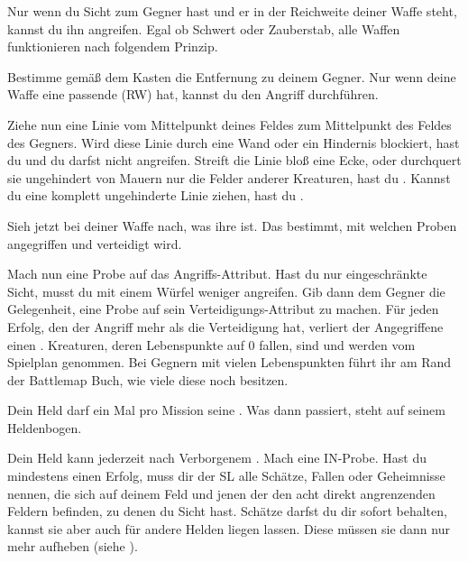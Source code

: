 {	

			Nur wenn du Sicht zum Gegner hast und er in der Reichweite deiner Waffe steht, kannst du ihn angreifen. Egal ob Schwert oder Zauberstab, alle Waffen funktionieren nach folgendem Prinzip.

			Bestimme gemäß dem Kasten  die Entfernung zu deinem Gegner. Nur wenn deine Waffe eine passende  (RW) hat, kannst du den Angriff durchführen.

			Ziehe nun eine Linie vom Mittelpunkt deines Feldes zum Mittelpunkt des Feldes des Gegners. Wird diese Linie durch eine Wand oder ein Hindernis blockiert, hast du  und du darfst nicht angreifen. Streift die Linie bloß eine Ecke, oder durchquert sie ungehindert von Mauern nur die Felder anderer Kreaturen, hast du . Kannst du eine komplett ungehinderte Linie ziehen, hast du .

			Sieh jetzt bei deiner Waffe nach, was ihre  ist. Das bestimmt, mit welchen Proben angegriffen und verteidigt wird.


			Mach nun eine Probe auf das Angriffs-Attribut. Hast du nur eingeschränkte Sicht, musst du mit einem Würfel weniger angreifen. Gib dann dem Gegner die Gelegenheit, eine Probe auf sein Verteidi\-gungs-Attribut zu machen. Für jeden Erfolg, den der Angriff mehr als die Verteidigung hat, verliert der Angegriffene einen . Kreaturen, deren Lebenspunkte auf 0 fallen, sind  und werden vom Spielplan genommen. Bei Gegnern mit vielen Lebenspunkten führt ihr am Rand der Battlemap Buch, wie viele diese noch besitzen.

			Dein Held darf ein Mal pro Mission seine . Was dann passiert, steht auf seinem Heldenbogen.

			Dein Held kann jederzeit nach Verborgenem . Mach eine IN-Probe. Hast du mindestens einen Erfolg, muss dir der SL alle Schätze, Fallen oder Geheimnisse nennen, die sich auf deinem Feld und jenen der den acht direkt angrenzenden Feldern befinden, zu denen du Sicht hast. Schätze darfst du dir sofort behalten, kannst sie aber auch für andere Helden liegen lassen. Diese müssen sie dann nur mehr aufheben (siehe ).

}
